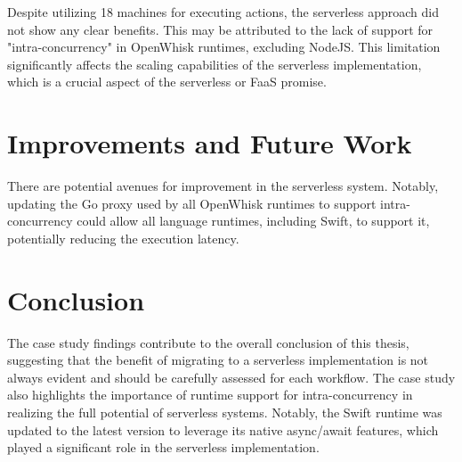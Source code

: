Despite utilizing 18 machines for executing actions, the serverless approach did not show any clear benefits. This may be attributed to the lack of support for "intra-concurrency" in OpenWhisk runtimes, excluding NodeJS. This limitation significantly affects the scaling capabilities of the serverless implementation, which is a crucial aspect of the serverless or FaaS promise.

\section{Improvements and Future Work}

There are potential avenues for improvement in the serverless system. Notably, updating the Go proxy used by all OpenWhisk runtimes to support intra-concurrency could allow all language runtimes, including Swift, to support it, potentially reducing the execution latency. 

\section{Conclusion}

The case study findings contribute to the overall conclusion of this thesis, suggesting that the benefit of migrating to a serverless implementation is not always evident and should be carefully assessed for each workflow. The case study also highlights the importance of runtime support for intra-concurrency in realizing the full potential of serverless systems. Notably, the Swift runtime was updated to the latest version to leverage its native async/await features, which played a significant role in the serverless implementation.



